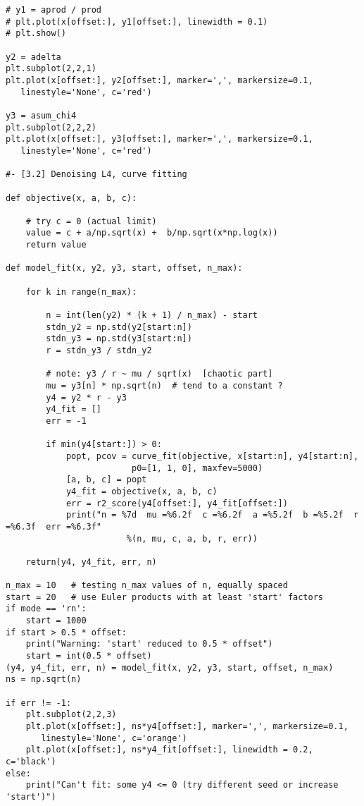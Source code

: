 \documentclass[oneside,10pt]{book}
\begin{document}
\begin{lstlisting}
# y1 = aprod / prod
# plt.plot(x[offset:], y1[offset:], linewidth = 0.1)
# plt.show()

y2 = adelta 
plt.subplot(2,2,1)
plt.plot(x[offset:], y2[offset:], marker=',', markersize=0.1, 
   linestyle='None', c='red')

y3 = asum_chi4 
plt.subplot(2,2,2)
plt.plot(x[offset:], y3[offset:], marker=',', markersize=0.1, 
   linestyle='None', c='red')

#- [3.2] Denoising L4, curve fitting

def objective(x, a, b, c):

    # try c = 0 (actual limit)
    value = c + a/np.sqrt(x) +  b/np.sqrt(x*np.log(x)) 
    return value

def model_fit(x, y2, y3, start, offset, n_max):
   
    for k in range(n_max):

        n = int(len(y2) * (k + 1) / n_max) - start  
        stdn_y2 = np.std(y2[start:n])
        stdn_y3 = np.std(y3[start:n])
        r = stdn_y3 / stdn_y2
        
        # note: y3 / r ~ mu / sqrt(x)  [chaotic part]
        mu = y3[n] * np.sqrt(n)  # tend to a constant ?
        y4 = y2 * r - y3
        y4_fit = []
        err = -1

        if min(y4[start:]) > 0: 
            popt, pcov = curve_fit(objective, x[start:n], y4[start:n], 
                         p0=[1, 1, 0], maxfev=5000)
            [a, b, c] = popt
            y4_fit = objective(x, a, b, c)
            err = r2_score(y4[offset:], y4_fit[offset:])
            print("n = %7d  mu =%6.2f  c =%6.2f  a =%5.2f  b =%5.2f  r =%6.3f  err =%6.3f"
                        %(n, mu, c, a, b, r, err))

    return(y4, y4_fit, err, n)

n_max = 10   # testing n_max values of n, equally spaced
start = 20   # use Euler products with at least 'start' factors 
if mode == 'rn':
    start = 1000
if start > 0.5 * offset:
    print("Warning: 'start' reduced to 0.5 * offset")
    start = int(0.5 * offset)
(y4, y4_fit, err, n) = model_fit(x, y2, y3, start, offset, n_max)
ns = np.sqrt(n)

if err != -1:
    plt.subplot(2,2,3)
    plt.plot(x[offset:], ns*y4[offset:], marker=',', markersize=0.1, 
       linestyle='None', c='orange')
    plt.plot(x[offset:], ns*y4_fit[offset:], linewidth = 0.2, c='black')
else:
    print("Can't fit: some y4 <= 0 (try different seed or increase 'start')")


\end{lstlisting}
\end{document}
